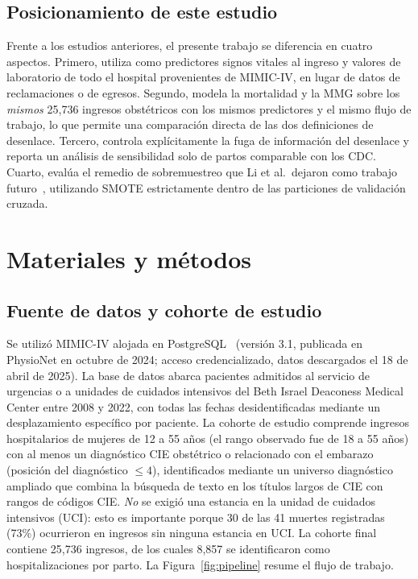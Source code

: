 \documentclass[healthcare,article,submit,pdftex,moreauthors]{Definitions/mdpi_es}
\begin{document}
\subsection{Posicionamiento de este estudio}
Frente a los estudios anteriores, el presente trabajo se diferencia en cuatro aspectos.
Primero, utiliza como predictores signos vitales al ingreso y valores de laboratorio de todo el
hospital provenientes de MIMIC-IV, en lugar de datos de reclamaciones o de egresos. Segundo,
modela la mortalidad y la MMG sobre los \emph{mismos} 25{,}736 ingresos obstétricos con los mismos
predictores y el mismo flujo de trabajo, lo que permite una comparación directa de las dos
definiciones de desenlace. Tercero, controla explícitamente la fuga de información del
desenlace y reporta un análisis de sensibilidad solo de partos comparable con los CDC. Cuarto,
evalúa el remedio de sobremuestreo que Li et al.\ dejaron como trabajo futuro~\cite{Li2025Maryland},
utilizando SMOTE estrictamente dentro de las particiones de validación cruzada.

\section{Materiales y métodos}\label{sec:methods}
\subsection{Fuente de datos y cohorte de estudio}
Se utilizó MIMIC-IV alojada en PostgreSQL~\cite{Johnson2023MIMICIV}
(versión 3.1, publicada en PhysioNet en octubre de 2024; acceso credencializado, datos descargados el 18 de abril de 2025). La base de datos abarca pacientes admitidos al servicio de urgencias o a unidades de cuidados intensivos del Beth Israel Deaconess Medical Center entre 2008 y 2022, con todas las fechas desidentificadas mediante un desplazamiento específico por paciente.
La cohorte de estudio comprende ingresos hospitalarios de mujeres de 12 a 55 años (el rango observado fue de 18 a 55 años) con al
menos un diagnóstico CIE obstétrico o relacionado con el embarazo (posición del diagnóstico
$\leq 4$), identificados mediante un universo diagnóstico ampliado que combina la búsqueda de
texto en los títulos largos de CIE con rangos de códigos CIE. \emph{No} se exigió una estancia en
la unidad de cuidados intensivos (UCI): esto es importante porque 30 de las 41 muertes registradas
(73\%) ocurrieron en ingresos sin ninguna estancia en UCI. La cohorte final contiene
25{,}736 ingresos, de los cuales 8{,}857 se identificaron como hospitalizaciones por parto.
La Figura~\ref{fig:pipeline} resume el flujo de trabajo.
\end{document}
